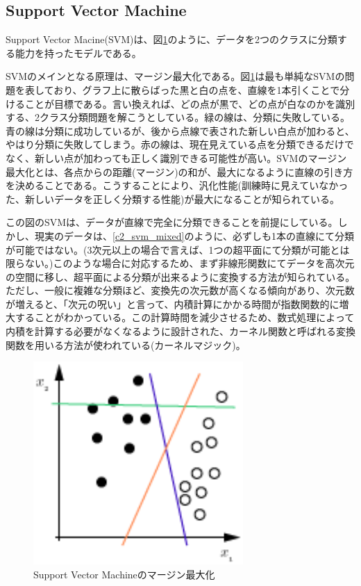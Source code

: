 \subsection{Support Vector Machine}
Support Vector Macine(SVM)は、図\ref{c2_svm}のように、データを2つのクラスに分類する能力を持ったモデルである\cite{cortes1995support-vector}。\par
SVMのメインとなる原理は、マージン最大化である。図\ref{c2_svm}は最も単純なSVMの問題を表しており、グラフ上に散らばった黒と白の点を、直線を1本引くことで分けることが目標である。言い換えれば、どの点が黒で、どの点が白なのかを識別する、2クラス分類問題を解こうとしている。緑の線は、分類に失敗している。青の線は分類に成功しているが、後から点線で表された新しい白点が加わると、やはり分類に失敗してしまう。赤の線は、現在見えている点を分類できるだけでなく、新しい点が加わっても正しく識別できる可能性が高い。SVMのマージン最大化とは、各点からの距離(マージン)の和が、最大になるように直線の引き方を決めることである。こうすることにより、汎化性能(訓練時に見えていなかった、新しいデータを正しく分類する性能)が最大になることが知られている。\par
この図のSVMは、データが直線で完全に分類できることを前提にしている。しかし、現実のデータは、\ref{c2_svm_mixed}のように、必ずしも1本の直線にて分類が可能ではない。(3次元以上の場合で言えば、1つの超平面にて分類が可能とは限らない。)このような場合に対応するため、まず非線形関数にてデータを高次元の空間に移し、超平面による分類が出来るように変換する方法が知られている\cite{burges1998tutorial}。ただし、一般に複雑な分類ほど、変換先の次元数が高くなる傾向があり、次元数が増えると、「次元の呪い」と言って、内積計算にかかる時間が指数関数的に増大することがわかっている\cite{bellman1961adaptive}。この計算時間を減少させるため、数式処理によって内積を計算する必要がなくなるように設計された、カーネル関数と呼ばれる変換関数を用いる方法が使われている(カーネルマジック)。
\begin{figure}[tbp]
 \centering
  \includegraphics[width=80mm]{img/c2/svm}
 \caption{Support Vector Machineのマージン最大化}
 \label{c2_svm}
\end{figure}
